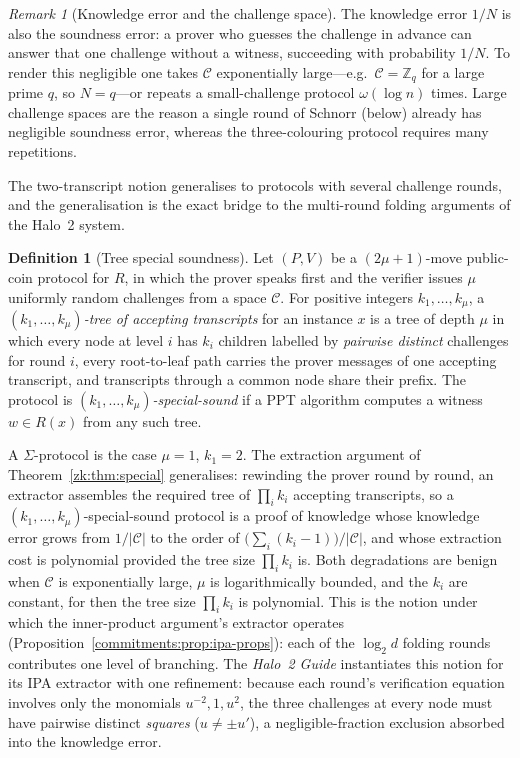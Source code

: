 \documentclass[11pt,a4paper]{article}
\theoremstyle{definition}
\newtheorem{definition}[theorem]{Definition}
\theoremstyle{remark}
\newtheorem{remark}[theorem]{Remark}
\begin{document}
\begin{remark}[Knowledge error and the challenge space]\label{zk:rem:challengesize}
The knowledge error \(1/N\) is also the soundness error: a prover who guesses the challenge in advance can answer that one challenge without a witness, succeeding with probability \(1/N\). To render this negligible one takes \(\mathcal{C}\) exponentially large---e.g.\ \(\mathcal{C} = \mathbb{Z}_q\) for a large prime \(q\), so \(N = q\)---or repeats a small-challenge protocol \(\omega(\log n)\) times. Large challenge spaces are the reason a single round of Schnorr (below) already has negligible soundness error, whereas the three-colouring protocol requires many repetitions.
\end{remark}

The two-transcript notion generalises to protocols with several challenge rounds, and the generalisation is the exact bridge to the multi-round folding arguments of the Halo~2 system.

\begin{definition}[Tree special soundness]\label{zk:def:treess}
Let \((P,V)\) be a \((2\mu+1)\)-move public-coin protocol for \(R\), in which the prover speaks first and the verifier issues \(\mu\) uniformly random challenges from a space \(\mathcal{C}\). For positive integers \(k_1, \dots, k_\mu\), a \emph{\((k_1, \dots, k_\mu)\)-tree of accepting transcripts} for an instance \(x\) is a tree of depth \(\mu\) in which every node at level \(i\) has \(k_i\) children labelled by \emph{pairwise distinct} challenges for round \(i\), every root-to-leaf path carries the prover messages of one accepting transcript, and transcripts through a common node share their prefix. The protocol is \emph{\((k_1, \dots, k_\mu)\)-special-sound} if a PPT algorithm computes a witness \(w \in R(x)\) from any such tree.
\end{definition}

A \(\Sigma\)-protocol is the case \(\mu = 1\), \(k_1 = 2\). The extraction argument of Theorem~\ref{zk:thm:special} generalises: rewinding the prover round by round, an extractor assembles the required tree of \(\prod_{i} k_i\) accepting transcripts, so a \((k_1,\dots,k_\mu)\)-special-sound protocol is a proof of knowledge whose knowledge error grows from \(1/|\mathcal{C}|\) to the order of \(\bigl(\sum_i (k_i - 1)\bigr)/|\mathcal{C}|\), and whose extraction cost is polynomial provided the tree size \(\prod_i k_i\) is. Both degradations are benign when \(\mathcal{C}\) is exponentially large, \(\mu\) is logarithmically bounded, and the \(k_i\) are constant, for then the tree size \(\prod_i k_i\) is polynomial. This is the notion under which the inner-product argument's extractor operates (Proposition~\ref{commitments:prop:ipa-props}): each of the \(\log_2 d\) folding rounds contributes one level of branching. The \emph{Halo~2 Guide} instantiates this notion for its IPA extractor with one refinement: because each round's verification equation involves only the monomials \(u^{-2}, 1, u^{2}\), the three challenges at every node must have pairwise distinct \emph{squares} (\(u \neq \pm u'\)), a negligible-fraction exclusion absorbed into the knowledge error.
\end{document}
